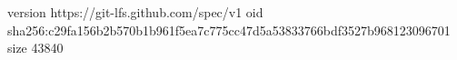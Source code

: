 version https://git-lfs.github.com/spec/v1
oid sha256:c29fa156b2b570b1b961f5ea7c775cc47d5a53833766bdf3527b968123096701
size 43840
